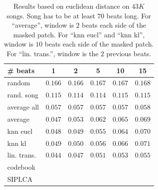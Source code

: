 \documentclass{article}
\begin{document}
\iffalse
\begin{table}[t]
\begin{small}
\begin{center}
\begin{tabular}{l|c|c|c|c|c|}
\# beats  & 1 & 2 & 5 & 10 & 15 \\ \hline \hline
random & $0.166$ & $0.166$ & $0.167$ & $0.167$ & $0.168$  \\
rand. song & $0.115$ & $0.114$ & $0.114$ & $0.115$ & $0.115$  \\
average all & $0.057$ & $0.057$ & $0.057$ & $0.057$ & $0.058$ \\
average & $0.047$ & $0.053$ & $0.062$ & $0.065$ & $0.069$ \\ \hline
knn eucl & $0.048$ & $0.049$ & $0.055$ & $0.064$ &  $0.070$ \\
knn kl & $0.049$ & $0.050$ & $0.056$ & $0.066$ &  $0.071$ \\
lin. trans. & $\mathbf{0.044}$ & $\mathbf{0.047}$ & $\mathbf{0.051}$ & $\mathbf{0.053}$ & $\mathbf{0.055}$ \\
codebook & & & & &  \\
SIPLCA & & & & &  \\ \hline
\end{tabular}
\caption{Results based on euclidean distance on $43K$ songs.
Song has to be at least $70$ beats long. 
For ``average'', window is $2$ beats each side of the masked patch.
For ``knn eucl'' and ``knn kl'', window is $10$ beats each side of the masked patch.
For ``lin. trans.'', window is the $2$ previous beats.}
\label{tab:reseucl}
\end{center}
\end{small}
\end{table}
\end{document}
